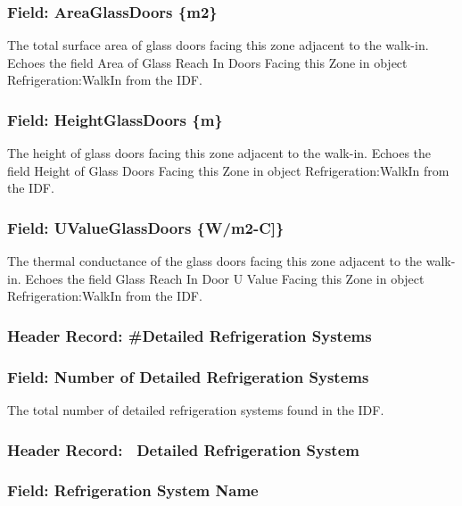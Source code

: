 \subsubsection{Field: AreaGlassDoors \{m2\}}\label{field-areaglassdoors-m2}

The total surface area of glass doors facing this zone adjacent to the walk-in. Echoes the field Area of Glass Reach In Doors Facing this Zone in object Refrigeration:WalkIn from the IDF.

\subsubsection{Field: HeightGlassDoors \{m\}}\label{field-heightglassdoors-m}

The height of glass doors facing this zone adjacent to the walk-in. Echoes the field Height of Glass Doors Facing this Zone in object Refrigeration:WalkIn from the IDF.

\subsubsection{Field: UValueGlassDoors \{W/m2-C{]}\}}\label{field-uvalueglassdoors-wm2-c}

The thermal conductance of the glass doors facing this zone adjacent to the walk-in. Echoes the field Glass Reach In Door U Value Facing this Zone in object Refrigeration:WalkIn from the IDF.

\subsubsection{Header Record: \#Detailed Refrigeration Systems}\label{header-record-detailed-refrigeration-systems}

\subsubsection{Field: Number of Detailed Refrigeration Systems}\label{field-number-of-detailed-refrigeration-systems}

The total number of detailed refrigeration systems found in the IDF.

\subsubsection{Header Record:~ Detailed Refrigeration System}\label{header-record-detailed-refrigeration-system}

\subsubsection{Field: Refrigeration System Name}\label{field-refrigeration-system-name}

